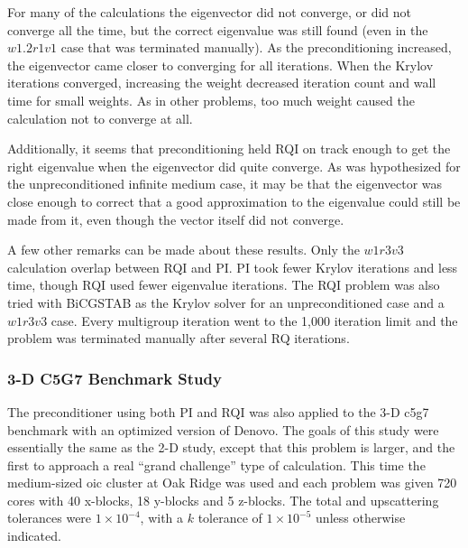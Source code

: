 For many of the calculations the eigenvector did not converge, or did not converge all the time, but the correct eigenvalue was still found (even in the $w1.2r1v1$ case that was terminated manually). As the preconditioning increased, the eigenvector came closer to converging for all iterations. When the Krylov iterations converged, increasing the weight decreased iteration count and wall time for small weights. As in other problems, too much weight caused the calculation not to converge at all. 

Additionally, it seems that preconditioning held RQI on track enough to get the right eigenvalue when the eigenvector did quite converge. As was hypothesized for the unpreconditioned infinite medium case, it may be that the eigenvector was close enough to correct that a good approximation to the eigenvalue could still be made from it, even though the vector itself did not converge. 

A few other remarks can be made about these results. Only the $w1r3v3$ calculation overlap between RQI and PI. PI took fewer Krylov iterations and less time, though RQI used fewer eigenvalue iterations. The RQI problem was also tried with BiCGSTAB as the Krylov solver for an unpreconditioned case and a $w1r3v3$ case. Every multigroup iteration went to the 1,000 iteration limit and the problem was terminated manually after several RQ iterations.

 \subsubsection{3-D C5G7 Benchmark Study}
The preconditioner using both PI and RQI was also applied to the 3-D c5g7 benchmark with an optimized version of Denovo. The goals of this study were essentially the same as the 2-D study, except that this problem is larger, and the first to approach a real ``grand challenge'' type of calculation. This time the medium-sized oic cluster at Oak Ridge was used and each problem was given 720 cores with 40 x-blocks, 18 y-blocks and 5 z-blocks. The total and upscattering tolerances were $1 \times 10^{-4}$, with a $k$ tolerance of $1 \times 10^{-5}$ unless otherwise indicated. 

